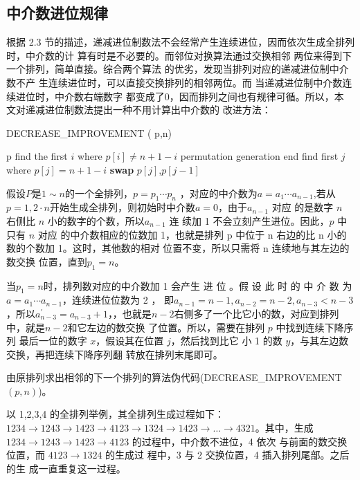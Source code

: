 \documentclass[6pt, twocolumn]{ctexart}
\begin{document}
\subsection{中介数进位规律}
根据 2.3 节的描述，递减进位制数法不会经常产生连续进位，因而依次生成全排列时，中介数的计 算有时是不必要的。而邻位对换算法通过交换相邻 两位来得到下一个排列，简单直接。综合两个算法 的优劣，发现当排列对应的递减进位制中介数不产 生连续进位时，可以直接交换排列的相邻两位。而 当递减进位制中介数连续进位时，中介数右端数字 都变成了0，因而排列之间也有规律可循。所以，本 文对递减进位制数法提出一种不用计算出中介数的 改进方法：
\begin{algorithm}
\caption{DECREASE\_IMPROVEMENT ( p,n)}
\label{alg2}
\begin{algorithmic}[1]
\PRINT p
\STATE find the first $i$ where $p[i] \ne n+1-i$
\RETURN permutation generation end
\ENDIF
{}
\STATE find first $j$ where $p[j] = n+1 -i$
\ENDFOR
\STATE \textbf{swap} $p[j]$,$p[j-1]$
\ENDFOR
{}
\ENDFOR
\ENDFOR
\end{algorithmic}
\end{algorithm}

假设$P$是$1 \sim n$的一个全排列，$p = p_1 \cdots p_n$ ，对应的中介数为$a = a_1 \cdots a_{n-1}$,若从$p = 1,2 \cdot n$开始生成全排列，则初始时中介数$𝑎 = 0$，由于$a_{n-1}$ 对应 的是数字 $n$ 右侧比 $n$ 小的数字的个数，所以$a_{n-1}$ 连 续加 1 不会立刻产生进位。因此，$p$ 中只有 $n$ 对应 的中介数相应的位数加 1，也就是排列 p 中位于 n 右边的比 n 小的数的个数加 1。这时，其他数的相对 位置不变，所以只需将 n 连续地与其左边的数交换 位置，直到$p_1=n$。

当$p_1 =n$时，排列数对应的中介数加 1 会产生 进 位 。假 设 此 时 的 中 介 数 为$a = a_1 \cdots a_{n-1}$，连续进位位数为 2 ， 即$a_{n-1}=n-1,a_{n-2}=n-2 ,a_{n-3}<n-3$，所以$a_{n-3}^{'}=a_{n-3}+1$，，也就是$n − 2$右侧多了一个比它小的数，对应到排列中，就是$n − 2$和它左边的数交换 了位置。所以，需要在排列 $p$ 中找到连续下降序列 最后一位的数字 $x$，假设其在位置 $j$，然后找到比它 小 1 的数 $y$，与其左边数交换，再把连续下降序列翻 转放在排列末尾即可。

由原排列求出相邻的下一个排列的算法伪代码(DECREASE\_IMPROVEMENT $( p,n)$)。

以 1,2,3,4 的全排列举例，其全排列生成过程如下：$1 2 3 4 → 1 2 4 3 → 1 4 2 3 → 4 1 2 3 → 1 3 2 4 → 1 4 2 3 → …→ 4 3 2 1$。其中，生成 $1 2 3 4 → 1 2 4 3 → 1 4 2 3 →4 1 2 3$ 的过程中，中介数不进位，4 依次 与前面的数交换位置，而 $4 1 2 3 → 1 3 2 4$ 的生成过 程中，3 与 2 交换位置，4 插入排列尾部。之后的生 成一直重复这一过程。
\end{document}
